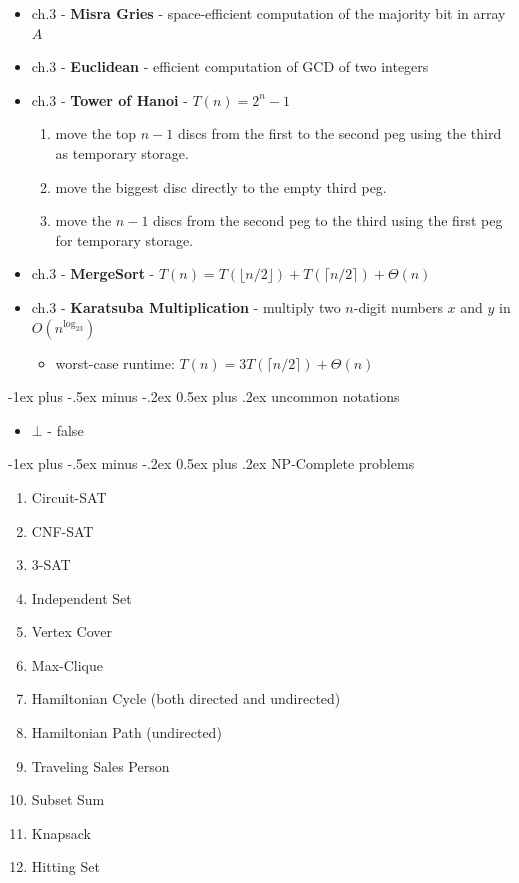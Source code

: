 \documentclass[10pt, landscape]{article}
\makeatletter
\renewcommand{\section}{\@startsection{section}{1}{0mm}%
  {-1ex plus -.5ex minus -.2ex}%
  {0.5ex plus .2ex}%
{\normalfont\large\bfseries}}
\makeatother
\begin{document}
\begin{itemize}
  \item ch.3 - \textbf{Misra Gries} - space-efficient computation of the majority bit in array $A$
  \item ch.3 - \textbf{Euclidean} - efficient computation of GCD of two integers
  \item ch.3 - \textbf{Tower of Hanoi} - $T(n) = 2^n-1$
    \begin{enumerate}
      \item move the top $n-1$ discs from the first to the second peg using the third as temporary storage. 
      \item move the biggest disc directly to the empty third peg.
      \item move the $n-1$ discs from the second peg to the third using the first peg for temporary storage.
    \end{enumerate}
  \item ch.3 - \textbf{MergeSort} - $T(n) = T(\lfloor n/2 \rfloor) + T(\lceil n/2 \rceil) + \Theta(n)$
  \item ch.3 - \textbf{Karatsuba Multiplication} - multiply two $n$-digit numbers $x$ and $y$ in $O(n^{\log_23})$
    \begin{itemize}
      \item worst-case runtime: $T(n) = 3T( \lceil n/2 \rceil ) + \Theta(n) $
    \end{itemize}
\end{itemize}

\section{uncommon notations}

\begin{itemize}
  \item $\bot$ - false
\end{itemize}

\pagebreak
\begin{multicols*}{4}
  \section{NP-Complete problems}
\begin{enumerate}
  \item Circuit-SAT
  \item CNF-SAT
  \item 3-SAT
  \item Independent Set
  \item Vertex Cover
  \item Max-Clique
  \item Hamiltonian Cycle (both directed and undirected)
  \item Hamiltonian Path (undirected)
  \item Traveling Sales Person
  \item Subset Sum
  \item Knapsack
  \item Hitting Set 
\end{enumerate}

\end{multicols*}
\end{document}
